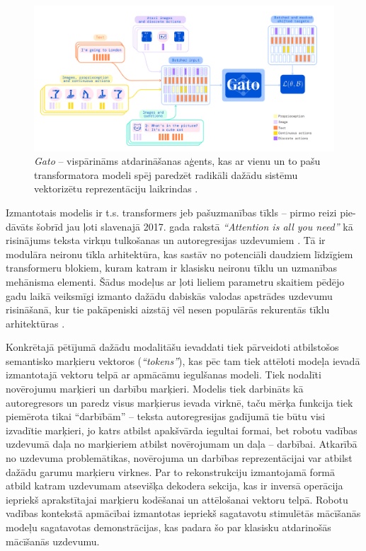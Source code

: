 \documentclass[12pt, a4paper]{article}
\numberwithin{equation}{section} %
\begin{document}
\begin{figure}[t!]
    \centering
    \includegraphics[width=16cm,page=1]{../img/gato.png}
    \caption{\textit{Gato} -- vispārināms atdarināšanas aģents, kas ar vienu un to pašu transformatora modeli spēj paredzēt radikāli dažādu sistēmu vektorizētu reprezentāciju laikrindas \cite{reed2022generalist}.}
\end{figure}

Izmantotais modelis ir t.s. transformers jeb pašuzmanības tīkls -- pirmo reizi pie-dāvāts šobrīd jau ļoti slavenajā 2017. gada rakstā \textit{``Attention is all you need''} kā risinājums teksta virkņu tulkošanas un autoregresijas uzdevumiem \cite{vaswani2017attention}. Tā ir modulāra neironu tīkla arhitektūra, kas sastāv no potenciāli daudziem līdzīgiem transformeru blokiem, kuram katram ir klasisku neironu tīklu un uzmanības mehānisma elementi. Šādus modeļus ar ļoti lieliem parametru skaitiem pēdējo gadu laikā veiksmīgi izmanto dažādu dabiskās valodas apstrādes uzdevumu risināšanā, kur tie pakāpeniski aizstāj vēl nesen populārās rekurentās tīklu arhitektūras \cite{radford2018improving}.

Konkrētajā pētījumā dažādu modalitāšu ievaddati tiek pārveidoti atbilstošos semantisko marķieru vektoros (\textit{``tokens''}), kas pēc tam tiek attēloti modeļa ievadā izmantotajā vektoru telpā ar apmācāmu iegulšanas modeli. Tiek nodalīti novērojumu marķieri un darbību marķieri. Modelis tiek darbināts kā autoregresors un paredz visus marķierus ievada virknē, taču mērķa funkcija tiek piemērota tikai ``darbībām'' -- teksta autoregresijas gadījumā tie būtu visi izvadītie marķieri, jo katrs atbilst apakšvārda iegultai formai, bet robotu vadības uzdevumā daļa no marķieriem atbilst novērojumam un daļa -- darbībai. Atkarībā no uzdevuma problemātikas, novērojuma un darbības reprezentācijai var atbilst dažādu garumu marķieru virknes. Par to rekonstrukciju izmantojamā formā atbild katram uzdevumam atsevišķa dekodera sekcija, kas ir inversā operācija iepriekš aprakstītajai marķieru kodēšanai un attēlošanai vektoru telpā. Robotu vadības kontekstā apmācībai izmantotas iepriekš sagatavotu stimulētās mācīšanās modeļu sagatavotas demonstrācijas, kas padara šo par klasisku atdarinošās mācīšanās uzdevumu. 
\end{document}
